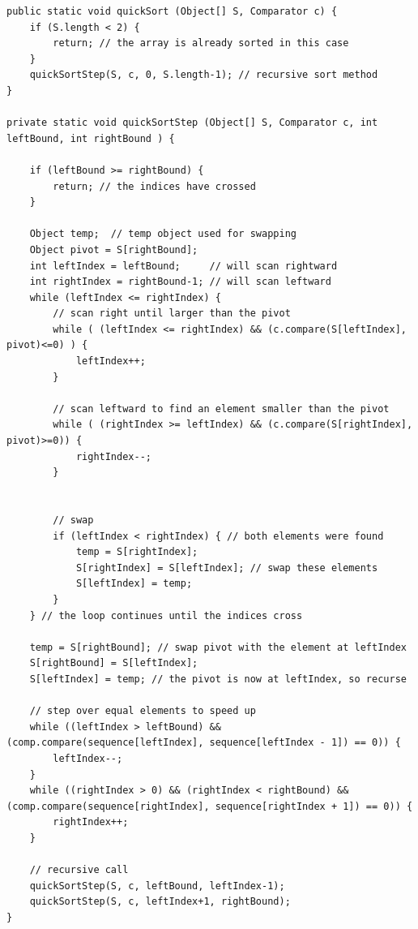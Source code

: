 \begin{lstlisting}[caption=Inplace Quick Sort]
public static void quickSort (Object[] S, Comparator c) {
	if (S.length < 2) {
		return; // the array is already sorted in this case
	}
	quickSortStep(S, c, 0, S.length-1); // recursive sort method
}

private static void quickSortStep (Object[] S, Comparator c, int leftBound, int rightBound ) {

	if (leftBound >= rightBound) {
		return; // the indices have crossed
	}

	Object temp;  // temp object used for swapping
	Object pivot = S[rightBound];
	int leftIndex = leftBound;     // will scan rightward
	int rightIndex = rightBound-1; // will scan leftward
	while (leftIndex <= rightIndex) {
		// scan right until larger than the pivot
		while ( (leftIndex <= rightIndex) && (c.compare(S[leftIndex], pivot)<=0) ) {
			leftIndex++;
		}

		// scan leftward to find an element smaller than the pivot
		while ( (rightIndex >= leftIndex) && (c.compare(S[rightIndex], pivot)>=0)) {
			rightIndex--;
		}


		// swap
		if (leftIndex < rightIndex) { // both elements were found
			temp = S[rightIndex];
			S[rightIndex] = S[leftIndex]; // swap these elements
			S[leftIndex] = temp;
		}
	} // the loop continues until the indices cross

	temp = S[rightBound]; // swap pivot with the element at leftIndex
	S[rightBound] = S[leftIndex];
	S[leftIndex] = temp; // the pivot is now at leftIndex, so recurse

	// step over equal elements to speed up
	while ((leftIndex > leftBound) && (comp.compare(sequence[leftIndex], sequence[leftIndex - 1]) == 0)) {
		leftIndex--;
	}
	while ((rightIndex > 0) && (rightIndex < rightBound) && (comp.compare(sequence[rightIndex], sequence[rightIndex + 1]) == 0)) {
		rightIndex++;
	}

	// recursive call
	quickSortStep(S, c, leftBound, leftIndex-1);
	quickSortStep(S, c, leftIndex+1, rightBound);
}

\end{lstlisting}

